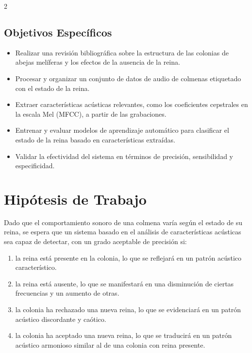\documentclass[12pt]{report}
\newenvironment{tightmulticols}{%
  \begin{multicols}{2}
  \setlength{\parskip}{1.2pt}
  \linespread{1}\selectfont
}{%
  \end{multicols}
}
\begin{document}
\begin{tightmulticols}
\subsection{Objetivos Específicos}

\begin{itemize}[label = ]
    \item Realizar una revisión bibliográfica sobre la estructura de las colonias de abejas melíferas y los efectos de la ausencia de la reina.
    \item Procesar y organizar un conjunto de datos de audio de colmenas etiquetado con el estado de la reina.
    \item Extraer características acústicas relevantes, como los coeficientes cepstrales en la escala Mel (MFCC), a partir de las grabaciones.
    \item Entrenar y evaluar modelos de aprendizaje automático para clasificar el estado de la reina basado en características extraídas.
    \item Validar la efectividad del sistema en términos de precisión, sensibilidad y especificidad.
\end{itemize}

\section{Hipótesis de Trabajo}

\noindent Dado que el comportamiento sonoro de una colmena varía según el estado de su reina, se espera que un sistema basado en el análisis de características acústicas sea capaz de detectar, con un grado aceptable de precisión si:
\begin{enumerate}
    \item la reina está presente en la colonia, lo que se reflejará en un patrón acústico característico.
    \item la reina está ausente, lo que se manifestará en una disminución de ciertas frecuencias y un aumento de otras.
    \item la colonia ha rechazado una nueva reina, lo que se evidenciará en un patrón acústico discordante y caótico.
    \item la colonia ha aceptado una nueva reina, lo que se traducirá en un patrón acústico armonioso similar al de una colonia con reina presente.
\end{enumerate}

\end{tightmulticols}
\end{document}

